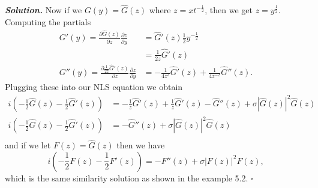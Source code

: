 \documentclass[12pt]{report}
\newenvironment{solution}[1][\it{Solution}]{\textbf{#1. } }{$\square$}
\def\half{\frac{1}{2}}
\newcommand{\paren}[1]{{\left(#1\right)}} %
\newcommand{\abs}[1]{{\left|#1\right|}} %
\newcommand{\pp}[2]{\frac{\partial #1}{\partial #2}} %
\begin{document}
\begin{solution}
    Now if we $G(y) = \hat{G}(z)$ where $z = xt^{-\half}$, then we get $z = y^{\half}$. Computing the partials
    \begin{align*}
        G'(y) = \pp{\hat{G}(z)}{z}\pp{z}{y} &= \hat{G}'(z) \half y^{-\half}\\
        &= \frac{1}{2z}\hat{G}'(z)\\
        G''(y) = \pp{\frac{1}{2z}\hat{G}'(z)}{z}\pp{z}{y} &= -\frac{1}{4z^3}\hat{G}'(z) + \frac{1}{4z^{-2}}\hat{G}''(z).
    \end{align*}
    Plugging these into our NLS equation we obtain
    \begin{align*}
        i\paren{-\half \hat{G}(z)-\half\hat{G}'(z)} &= -\frac{1}{z}\hat{G}'(z) + \frac{1}{z}\hat{G}'(z) - \hat{G}''(z) + \sigma \abs{\hat{G}(z)}^2\hat{G}(z)\\
        i\paren{-\half \hat{G}(z)-\half\hat{G}'(z)} &= - \hat{G}''(z) + \sigma \abs{\hat{G}(z)}^2\hat{G}(z)\\
    \end{align*}
    and if we let $F(z) = \hat{G}(z)$ then we have
    \[
        i\paren{-\half F(z)-\half F'(z)} = - F''(z) + \sigma \abs{F(z)}^2F(z),
    \]
    which is the same similarity solution as shown in the example 5.2.
\end{solution}

\newpage


\end{document}
